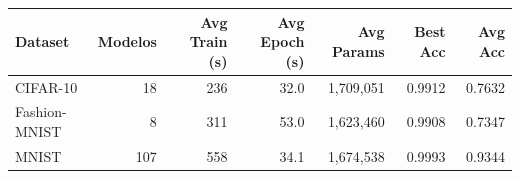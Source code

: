 \begin{tabular}{lrrrrrr}
\toprule
Dataset & Modelos & Avg Train (s) & Avg Epoch (s) & Avg Params & Best Acc & Avg Acc \\
\midrule
CIFAR-10 & 18 & 236 & 32.0 & 1,709,051 & 0.9912 & 0.7632 \\
Fashion-MNIST & 8 & 311 & 53.0 & 1,623,460 & 0.9908 & 0.7347 \\
MNIST & 107 & 558 & 34.1 & 1,674,538 & 0.9993 & 0.9344 \\
\bottomrule
\end{tabular}